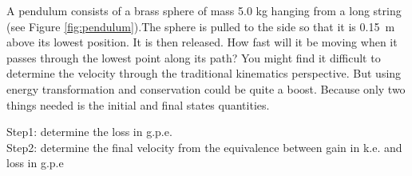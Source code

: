 \documentclass[a4paper]{tufte-handout}
\newenvironment{ExampleBox} %
{\begin{tcolorbox}[breakable,colback=g1!30,colframe=g1,title=Example]} {\end{tcolorbox}}
\begin{document}
\begin{ExampleBox}
A pendulum consists of a brass sphere of mass 5.0 kg hanging from a long string (see Figure \ref{fig:pendulum}).The sphere is pulled to the side so that it is \SI{0.15}{\m} above its lowest position. It is then released. How fast will it be moving when it passes through the lowest point along its path?
\tcblower
You might find it difficult to determine the velocity through the traditional kinematics perspective. But using energy transformation and conservation could be quite a boost. Because only two things needed is the initial and final states quantities.

Step1: determine the loss in g.p.e.\\
\vspace{0.4in}
Step2: determine the final velocity from the equivalence between gain in k.e. and loss in g.p.e
\vspace{0.4in}
\end{ExampleBox}
\end{document}

